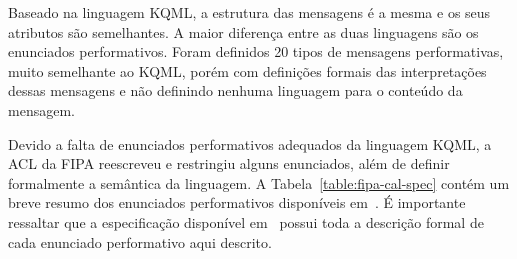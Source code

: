 Baseado na linguagem KQML, a estrutura das mensagens é a mesma e os seus atributos são semelhantes. A maior diferença entre as duas linguagens são os enunciados performativos. Foram definidos 20 tipos de mensagens performativas, muito semelhante ao KQML, porém com definições formais das interpretações dessas mensagens e não definindo nenhuma linguagem para o conteúdo da mensagem.

Devido a falta de enunciados performativos adequados da linguagem KQML, a ACL da FIPA reescreveu e restringiu alguns enunciados, além de definir formalmente a semântica da linguagem. A Tabela~\ref{table:fipa-cal-spec} contém um breve resumo dos enunciados performativos disponíveis em~\cite{fipa-cal-spec}. É importante ressaltar que a especificação disponível em~\cite{fipa-cal-spec} possui toda a descrição formal de cada enunciado performativo aqui descrito.

